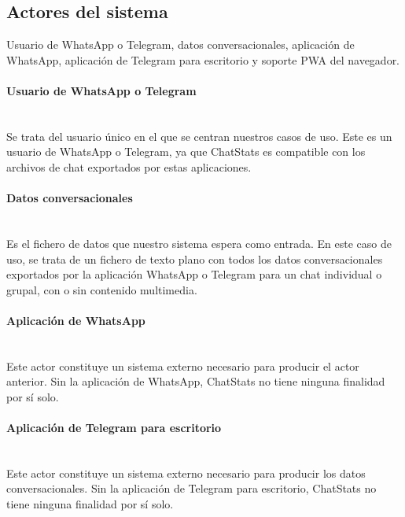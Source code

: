 \subsection{Actores del sistema}
\label{subsec:system-actors}

Usuario de WhatsApp o Telegram, datos conversacionales, aplicación de WhatsApp, aplicación de Telegram para escritorio y soporte PWA del navegador.

\paragraph{Usuario de WhatsApp o Telegram}\mbox{}\\

Se trata del usuario único en el que se centran nuestros casos de uso. Este es un usuario de WhatsApp o Telegram, ya que ChatStats es compatible con los archivos de chat exportados por estas aplicaciones.

\paragraph{Datos conversacionales}\mbox{}\\

Es el fichero de datos que nuestro sistema espera como entrada. En este caso de uso, se trata de un fichero de texto plano con todos los datos conversacionales exportados por la aplicación WhatsApp o Telegram para un chat individual o grupal, con o sin contenido multimedia.

\paragraph{Aplicación de WhatsApp}\mbox{}\\

Este actor constituye un sistema externo necesario para producir el actor anterior. Sin la aplicación de WhatsApp, ChatStats no tiene ninguna finalidad por sí solo.

\paragraph{Aplicación de Telegram para escritorio}\mbox{}\\

Este actor constituye un sistema externo necesario para producir los datos conversacionales. Sin la aplicación de Telegram para escritorio, ChatStats no tiene ninguna finalidad por sí solo.

